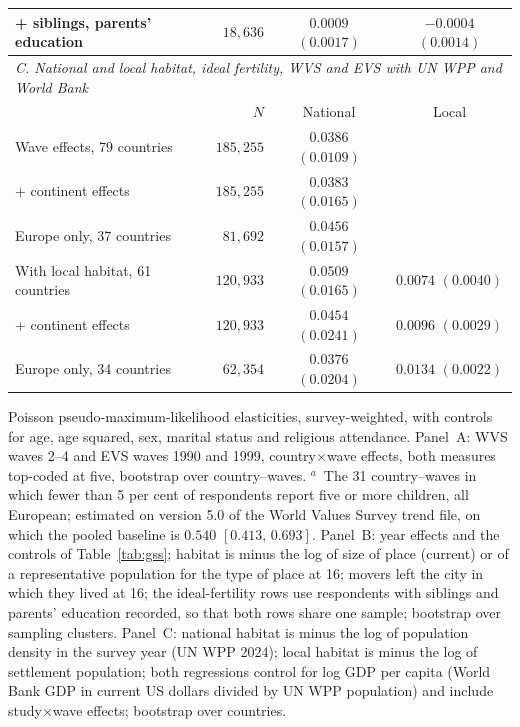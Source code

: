 \documentclass[11pt]{article}
\begin{document}
\begin{table}[h!]
\begin{threeparttable}
\begin{tabular}{lrcc}
\quad + siblings, parents' education     & $18{,}636$ & $0.0009$ $(0.0017)$ & $-0.0004$ $(0.0014)$\\
\midrule
\multicolumn{4}{l}{\emph{C. National and local habitat, ideal fertility, WVS and EVS with UN WPP and World Bank}}\\
& $N$ & National & Local\\
\midrule
Wave effects, 79 countries                & $185{,}255$ & $0.0386$ $(0.0109)$ & \\
\quad + continent effects                 & $185{,}255$ & $0.0383$ $(0.0165)$ & \\
\quad Europe only, 37 countries           & $81{,}692$  & $0.0456$ $(0.0157)$ & \\
With local habitat, 61 countries          & $120{,}933$ & $0.0509$ $(0.0165)$ & $0.0074$ $(0.0040)$\\
\quad + continent effects                 & $120{,}933$ & $0.0454$ $(0.0241)$ & $0.0096$ $(0.0029)$\\
\quad Europe only, 34 countries           & $62{,}354$  & $0.0376$ $(0.0204)$ & $0.0134$ $(0.0022)$\\
\bottomrule
\end{tabular}
\begin{tablenotes}\footnotesize
\item Poisson pseudo-maximum-likelihood elasticities, survey-weighted, with controls for age, age squared, sex,
marital status and religious attendance. Panel~A: WVS waves 2--4 and EVS waves 1990 and 1999,
country$\times$wave effects, both measures top-coded at five, bootstrap over country--waves.
$^{a}$~The 31 country--waves in which fewer than 5 per cent of respondents report five or more
children, all European; estimated on version 5.0 of the World Values Survey trend file, on which the
pooled baseline is $0.540$
$[0.413,\,0.693]$. Panel~B: year effects and the controls of
Table~\ref{tab:gss}; habitat is minus the log of size of place (current) or of a representative
population for the type of place at 16; movers left the city in which they lived at 16; the
ideal-fertility rows use respondents with siblings and parents' education recorded, so that both rows
share one sample; bootstrap over sampling clusters. Panel~C: national habitat is minus the log of population density in the
survey year (UN WPP 2024); local habitat is minus the log of settlement population; both
regressions control for log GDP per capita (World Bank GDP in current US dollars divided by UN WPP
population) and include study$\times$wave effects;
bootstrap over countries.
\end{tablenotes}
\end{threeparttable}
\end{table}
\end{document}
